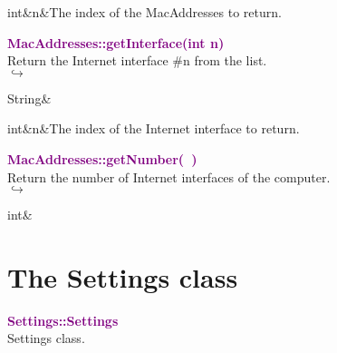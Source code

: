 \begin{tcolorbox}[width=\textwidth,myArgs,tabularx={ll|R}]
int&n&The index of the MacAddresses to return.
\end{tcolorbox}


\textcolor{purple}{\textbf{MacAddresses::getInterface(int n)}}\label{MacAddresses::getInterface(int n)}\\
Return the Internet interface \#n from the list.\\ \hspace*{5mm}$\hookrightarrow$
\vspace*{-2em}\begin{tcolorbox}[grow to left by=-1cm, width=\textwidth-1cm,myArgs,tabularx={l|R}]
String&
\end{tcolorbox}

\begin{tcolorbox}[width=\textwidth,myArgs,tabularx={ll|R}]
int&n&The index of the Internet interface to return.
\end{tcolorbox}


\textcolor{purple}{\textbf{MacAddresses::getNumber(~)}}\label{MacAddresses::getNumber()}\\
Return the number of Internet interfaces of the computer.\\ \hspace*{5mm}$\hookrightarrow$
\vspace*{-2em}\begin{tcolorbox}[grow to left by=-1cm, width=\textwidth-1cm,myArgs,tabularx={l|R}]
int&
\end{tcolorbox}


\section{The Settings class}

\textcolor{purple}{\textbf{Settings::Settings}}\label{Settings::Settings}\\
Settings class.


